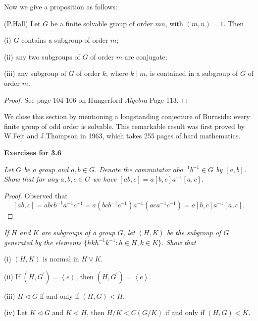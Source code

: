 Now we give a proposition as follows:
\begin{proposition}(P.Hall)
Let $G$ be a finite solvable group of order $mn$, with $(m,n)=1$. Then\par
(i) $G$ contains a subgroup of order $m$;\par
(ii) any two subgroups of $G$ of order $m$ are conjugate;\par
(iii) any subgroup of $G$ of order $k$, where $k\mid m$, is contained in a subgroup of $G$ of order $m$.
\end{proposition}
\begin{proof}
See page 104-106 on Hungerford \textit{Algebra} Page 113.
\end{proof}
We close this section by mentioning a longstanding conjecture of Burnside: every finite group of odd order is solvable. This remarkable result was first proved by W.Feit and J.Thompson in 1963, which takes 255 pages of hard mathematics.
\begin{center}
\begin{large}
    \textbf{Exercises for 3.6}
\end{large}
\end{center}
\begin{problem}\em
Let $G$ be a group and $a,b\in G$. Denote the commutator $aba^{-1}b^{-1}\in G$ by $[a,b]$. Show that for any $a,b,c\in G$ we have $[ab,c]=a[b,c]a^{-1}[a,c]$.
\end{problem}
\begin{proof}
Observed that 
$$
\left[ ab,c \right] =abcb^{-1}a^{-1}c^{-1}=a\left( bcb^{-1}c^{-1} \right) a^{-1}\left( aca^{-1}c^{-1} \right) =a\left[ b,c \right] a^{-1}\left[ a,c \right] .
$$
\end{proof}
\begin{problem}\em
If $H$ and $K$ are subgroups of a group $G$, let $(H,K)$ be the subgroup of $G$ generated by the elements $\{hkh^{-1}k^{-1}:h\in H,k\in K\}$. Show that\par
(i) $(H,K)$ is normal in $H\vee K$.\par
(ii) If $(H,G^\prime)=\left<e\right>$, then $(H,G^\prime)=\left<e\right>$.\par
(iii) $H\lhd G$ if and only if $(H,G)<H$.\par
(iv) Let $K\lhd G$ and $K<H$, then $H/K<C(G/K)$ if and only if $(H,G)<K$.
\end{problem}
